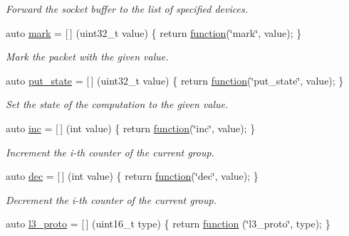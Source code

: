 \begin{DoxyCompactItemize}
\begin{DoxyCompactList}\small\item\em Forward the socket buffer to the list of specified devices. \end{DoxyCompactList}\item 
auto \hyperlink{namespacepfq_1_1lang_1_1anonymous__namespace_02default_8hpp_03_a7b831baeabda070b89ca862a9445a4a8}{mark} = \mbox{[}$\,$\mbox{]} (uint32\+\_\+t value) \{ return \hyperlink{namespacepfq_1_1lang_a1a4638059d700ae08d0ca63886ff2bb3}{function}(\char`\"{}mark\char`\"{}, value); \}
\begin{DoxyCompactList}\small\item\em Mark the packet with the given value. \end{DoxyCompactList}\item 
auto \hyperlink{namespacepfq_1_1lang_1_1anonymous__namespace_02default_8hpp_03_afd94f51db878b2f70225c944c3f1d300}{put\+\_\+state} = \mbox{[}$\,$\mbox{]} (uint32\+\_\+t value) \{ return \hyperlink{namespacepfq_1_1lang_a1a4638059d700ae08d0ca63886ff2bb3}{function}(\char`\"{}put\+\_\+state\char`\"{}, value); \}
\begin{DoxyCompactList}\small\item\em Set the state of the computation to the given value. \end{DoxyCompactList}\item 
auto \hyperlink{namespacepfq_1_1lang_1_1anonymous__namespace_02default_8hpp_03_acc7d3a4cca5eb30ff5456e19c613b174}{inc} = \mbox{[}$\,$\mbox{]} (int value) \{ return \hyperlink{namespacepfq_1_1lang_a1a4638059d700ae08d0ca63886ff2bb3}{function}(\char`\"{}inc\char`\"{}, value); \}
\begin{DoxyCompactList}\small\item\em Increment the i-\/th counter of the current group. \end{DoxyCompactList}\item 
auto \hyperlink{namespacepfq_1_1lang_1_1anonymous__namespace_02default_8hpp_03_a139906841e77a2eb86b761b27ceeb685}{dec} = \mbox{[}$\,$\mbox{]} (int value) \{ return \hyperlink{namespacepfq_1_1lang_a1a4638059d700ae08d0ca63886ff2bb3}{function}(\char`\"{}dec\char`\"{}, value); \}
\begin{DoxyCompactList}\small\item\em Decrement the i-\/th counter of the current group. \end{DoxyCompactList}\item 
auto \hyperlink{namespacepfq_1_1lang_1_1anonymous__namespace_02default_8hpp_03_a1515f230673119530cd04f213627976f}{l3\+\_\+proto} = \mbox{[}$\,$\mbox{]} (uint16\+\_\+t type) \{ return \hyperlink{namespacepfq_1_1lang_a1a4638059d700ae08d0ca63886ff2bb3}{function} (\char`\"{}l3\+\_\+proto\char`\"{}, type); \}

\end{DoxyCompactItemize}
